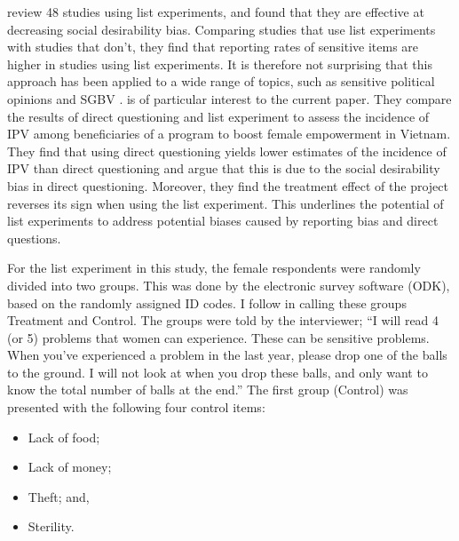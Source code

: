 \documentclass[10pt,a4paper,abstract=on]{scrartcl} %
\begin{document}
\cite{Holbrook2010} review 48 studies using list experiments, and found that they are effective at decreasing social desirability bias. Comparing studies that use list experiments with studies that don't, they find that reporting rates of sensitive items are higher in studies using list experiments. It is therefore not surprising that this approach has been applied to a wide range of topics, such as sensitive political opinions \citep{Frye2017,Blair2014,Meng2017} and SGBV \citep{Bulte2019}. \cite{Bulte2019} is of particular interest to the current paper. They compare the results of direct questioning and list experiment to assess the incidence of IPV among beneficiaries of a program to boost female empowerment in Vietnam. They find that using direct questioning yields lower estimates of the incidence of IPV than direct questioning and argue that this is due to the social desirability bias in direct questioning. Moreover, they find the treatment effect of the project reverses its sign when using the list experiment. This underlines the potential of list experiments to address potential biases caused by reporting bias and direct questions.

For the list experiment in this study, the female respondents were randomly divided into two groups. This was done by the electronic survey software (ODK), based on the randomly assigned ID codes. I follow \cite{Imai2011} in calling these groups Treatment and Control. The groups were told by the interviewer; ``I will read 4 (or 5) problems that women can experience. These can be sensitive problems. When you've experienced a problem in the last year, please drop one of the balls to the ground. I will not look at when you drop these balls, and only want to know the total number of balls at the end.'' The first group (Control) was presented with the following four control items:
\begin{itemize}
	\item Lack of food;
	\item Lack of money;
	\item Theft; and,
	\item Sterility. %
\end{itemize}
\end{document}
